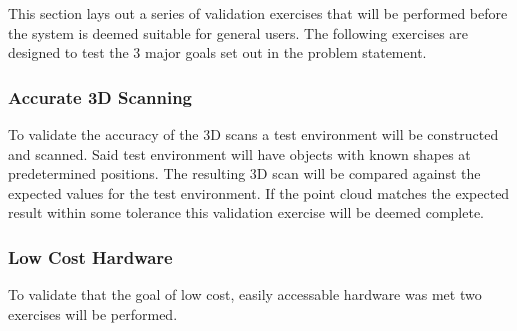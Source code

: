 \documentclass[12pt, titlepage]{article}
\begin{document}



This section lays out a series of validation exercises that will be performed before the system is deemed
suitable for general users. The following exercises are designed to test the 3 major goals set out
in the problem statement.

\subsubsection{Accurate 3D Scanning}

To validate the accuracy of the 3D scans a test environment will be constructed and
scanned. Said test environment will have objects with known shapes at predetermined positions.
The resulting 3D scan will be compared against the expected values for the test environment.
If the point cloud matches the expected result within some tolerance this validation exercise will
be deemed complete. 

\subsubsection{Low Cost Hardware}

To validate that the goal of low cost, easily accessable hardware was met two exercises will be performed. 
\ \\
\end{document}
